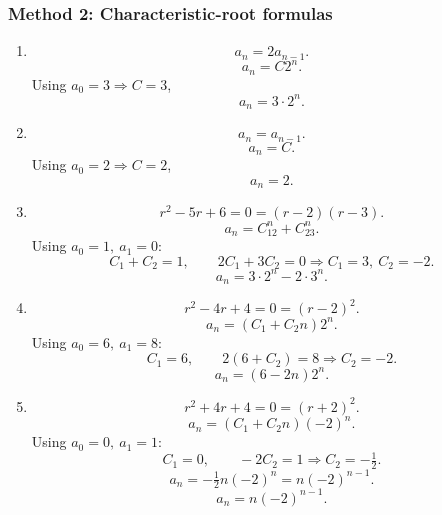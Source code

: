 \documentclass[12pt]{article}
\begin{document}
\subsubsection*{Method 2: Characteristic-root formulas}
\begin{enumerate}[label=(\alph*)]

\item
\[
a_n=2a_{n-1}.
\]
\[
a_n=C2^n.
\]
Using \(a_0=3\Rightarrow C=3\),
\[
\boxed{a_n=3\cdot2^n.}
\]

\item
\[
a_n=a_{n-1}.
\]
\[
a_n=C.
\]
Using \(a_0=2\Rightarrow C=2\),
\[
\boxed{a_n=2.}
\]

\item
\[
r^2-5r+6=0=(r-2)(r-3).
\]
\[
a_n=C_12^n+C_23^n.
\]
Using \(a_0=1,\ a_1=0\):
\[
C_1+C_2=1,\qquad2C_1+3C_2=0
\Rightarrow C_1=3,\ C_2=-2.
\]
\[
\boxed{a_n=3\cdot2^n-2\cdot3^n.}
\]

\item
\[
r^2-4r+4=0=(r-2)^2.
\]
\[
a_n=(C_1+C_2n)2^n.
\]
Using \(a_0=6,\ a_1=8\):
\[
C_1=6,\qquad2(6+C_2)=8\Rightarrow C_2=-2.
\]
\[
\boxed{a_n=(6-2n)2^n.}
\]

\item
\[
r^2+4r+4=0=(r+2)^2.
\]
\[
a_n=(C_1+C_2n)(-2)^n.
\]
Using \(a_0=0,\ a_1=1\):
\[
C_1=0,\qquad-2C_2=1\Rightarrow C_2=-\tfrac12.
\]
\[
a_n=-\tfrac12 n(-2)^n=n(-2)^{n-1}.
\]
\[
\boxed{a_n=n(-2)^{n-1}.}
\]

\end{enumerate}
\end{document}
